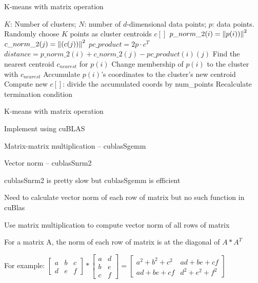 \documentclass[
nopagebreaks,
style=klope,
fleqn]{powerdot}
\begin{document}
\begin{slide}{K-means with matrix operation}
  \scriptsize
  \begin{algorithmic}[1]
    \INPUT $K$: Number of clusters; $N$: number of $d$-dimensional data points; $p$: data points.
     \label{alg:pm}
    \State Randomly choose $K$ points as cluster centroids $c[]$
    \State $p\_norm\_2(i) = \left\lVert p(i))\right\rVert^2$
    \EndFor
    \State $c\_norm\_2(j) = \left\lVert(c(j))\right\rVert^2$
    \EndFor
    \State $pc\_product = 2 p \cdot c^T$
    \State $distance = p\_norm\_2(i) + c\_norm\_2(j) - pc\_product(i)(j)$
    \EndFor
    \State Find the nearest centroid $c_{nearest}$ for $p(i)$
    \State Change membership of $p(i)$ to the cluster with $c_{nearest}$
    \State Accumulate $p(i)$'s coordinates to the cluster's new centroid
    \EndParFor
    \State Compute new $c[]$: divide the accumulated coords by num\_points
    \State Recalculate termination condition
    \EndWhile
    \EndFunction
  \end{algorithmic}
\end{slide}

\begin{slide}{K-means with matrix operation}
  \begin{compactitem}
  \item{Implement using cuBLAS}
  \item{Matrix-matrix multiplication -- cublasSgemm}
  \item{Vector norm -- cublasSnrm2}
  \item{cublasSnrm2 is pretty slow but cublasSgemm is efficient
    \begin{compactitem}
    \item{Need to calculate vector norm of each row of matrix but no such function in cuBlas}
    \end{compactitem}
  }
  \item{Use matrix multiplication to compute vector norm of all rows of matrix
    \begin{compactitem}
    \item{For a matrix A, the norm of each row of matrix is at the diagonal of $A * A^T$}
    \item{For example: 
      $
      \begin{bmatrix}
        a & b & c\\
        d & e & f
      \end{bmatrix}
      *
      \begin{bmatrix}
        a & d \\
        b & e \\
        c & f
      \end{bmatrix}
      =
      \begin{bmatrix}
        a^2+b^2+c^2 & ad + be + cf \\
        ad + be + cf & d^2 + e^2 + f^2
      \end{bmatrix}
      $
    }  
    \end{compactitem}
  } 
  \end{compactitem}
\end{slide}
\end{document}
